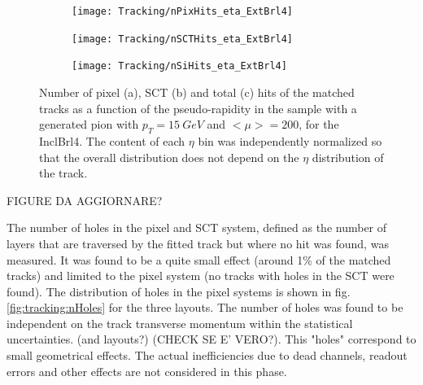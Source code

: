 \documentclass[a4paper,twoside,12pt]{article}
\begin{document}
\begin{figure}
\begin{subfigure}{\linewidth}
\centering
\texttt{[image: Tracking/nPixHits\_eta\_ExtBrl4]}
\caption{}
\label{fig:tracking:nPixHits_eta_InclBrl4}
\end{subfigure}

\begin{subfigure}{\linewidth}
\centering
\texttt{[image: Tracking/nSCTHits\_eta\_ExtBrl4]}
\caption{}
\label{fig:tracking:nSCTHits_eta_InclBrl4}
\end{subfigure}

\begin{subfigure}{\linewidth}
\centering
\texttt{[image: Tracking/nSiHits\_eta\_ExtBrl4]}
\caption{}
\label{fig:tracking:nSiHits_eta_InclBrl4}
\end{subfigure}
\caption{Number of pixel (a), SCT (b) and total (c) hits of the matched tracks as a function of the pseudo-rapidity in the sample with a generated pion with $p_{T} = 15\ GeV$ and $<\mu> = 200$, for the InclBrl4. The content of each $\eta$ bin was independently normalized so that the overall distribution does not depend on the $\eta$ distribution of the track.}
\label{fig:tracking:nHits_eta_InclBrl4}
\end{figure}

\begin{table} [h]
\centering
	\caption{Average number of pixel, SCT and total hits in the three ITk layouts considered.}
	\label{tab:tracking:nHits}
\end{table}

FIGURE DA AGGIORNARE?
 
The number of holes in the pixel and SCT system, defined as the number of layers that are traversed by the fitted track but where no hit was found, was measured. It was found to be
a quite small effect (around 1\% of the matched tracks) and limited to the pixel system (no tracks with holes in the SCT were found). The distribution of holes in the pixel systems is shown in fig.\ref{fig:tracking:nHoles} for the three 
layouts. The number of holes was found to be independent on the track transverse momentum within the statistical uncertainties. (and layouts?) (CHECK SE E' VERO?). 
This "holes" correspond to small geometrical effects. The actual inefficiencies due to dead channels, readout errors and other effects are not considered in this phase.\\
\end{document}
